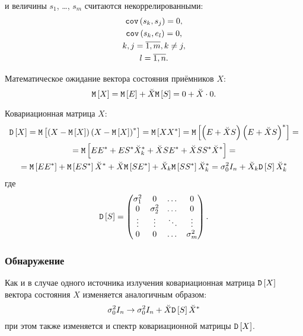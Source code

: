 и величины $s_1$, \dots, $s_m$ считаются некоррелированными:
\begin{gather*}
    \mathtt{cov} \left ( s_k, s_j \right ) = 0 , \\
    \mathtt{cov} \left ( s_k, e_l \right ) = 0 , \\
    k,j = \overline{1,m}, k \neq j, \\
    l = \overline{1, n} .
\end{gather*}

Математическое ожидание вектора состояния приёмников $X$:
\[
    \mathtt{M} \left [ X \right ]
    = \mathtt{M} \left [ E \right ] + \breve{X} \mathtt{M} \left [ S \right ]
    = 0 + \breve{X} \cdot 0 .
\]

Ковариационная матрица $X$:
\begin{multline*}
    \mathtt{D} \left [ X \right ]
    = \mathtt{M} \left [ \left( X - \mathtt{M} \left [ X \right ] \right) \left( X - \mathtt{M} \left [ X \right ] \right)^* \right ]
    = \mathtt{M} \left [ X X^* \right ]
    = \mathtt{M} \left [ \left( E + \breve{X} S \right) \left( E + \breve{X} S \right)^* \right ] = \\
    = \mathtt{M} \left [ E E^* + E S^* \breve{X}_k^* + \breve{X} S E^* + \breve{X} S S^* \breve{X}^* \right ] = \\
    = \mathtt{M} \left [ E E^* \right ] + \mathtt{M} \left [ E S^* \right ] \breve{X}^* + \breve{X} \mathtt{M} \left [ S E^* \right ] + \breve{X}_k \mathtt{M} \left [ S S^* \right ] \breve{X}_k^*
    = \sigma_0^2 I_n + \breve{X}_k \mathtt{D} \left [ S \right ] \breve{X}_k^*
\end{multline*}
где
\begin{gather*}
    \mathtt{D} \left [ S \right ] =
    \begin{pmatrix}
        \sigma_1^2 & 0          & \dots  & 0          \\
        0          & \sigma_2^2 & \dots  & 0          \\
        \vdots     & \vdots     & \ddots & \vdots     \\
        0          & 0          & \dots  & \sigma_m^2
    \end{pmatrix} .
\end{gather*}

\subsubsection{Обнаружение}

Как и в случае одного источника излучения ковариационная матрица $\mathtt{D} \left [ X \right ]$ вектора состояния $X$ изменяется аналогичным образом:
\[
    \sigma_0^2 I_n \rightarrow \sigma_0^2 I_n + \breve{X} \mathtt{D} \left [ S \right ] \breve{X}^*
\]
при этом также изменяется и спектр ковариационной матрицы $\mathtt{D} \left [ X \right ]$.

